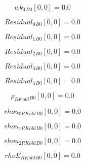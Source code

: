 \documentclass{article}
\begin{document}
\begin{dmath}{wk_{4}{_{B0}}}[{0,0}] = 0.0\end{dmath}

\begin{dmath}{Residual_{0}{_{B0}}}[{0,0}] = 0.0\end{dmath}

\begin{dmath}{Residual_{1}{_{B0}}}[{0,0}] = 0.0\end{dmath}

\begin{dmath}{Residual_{2}{_{B0}}}[{0,0}] = 0.0\end{dmath}

\begin{dmath}{Residual_{3}{_{B0}}}[{0,0}] = 0.0\end{dmath}

\begin{dmath}{Residual_{4}{_{B0}}}[{0,0}] = 0.0\end{dmath}

\begin{dmath}{\rho_{RKold}{_{B0}}}[{0,0}] = 0.0\end{dmath}

\begin{dmath}{rhou_{0 RKold}{_{B0}}}[{0,0}] = 0.0\end{dmath}

\begin{dmath}{rhou_{1 RKold}{_{B0}}}[{0,0}] = 0.0\end{dmath}

\begin{dmath}{rhou_{2 RKold}{_{B0}}}[{0,0}] = 0.0\end{dmath}

\begin{dmath}{rhoE_{RKold}{_{B0}}}[{0,0}] = 0.0\end{dmath}
\end{document}
